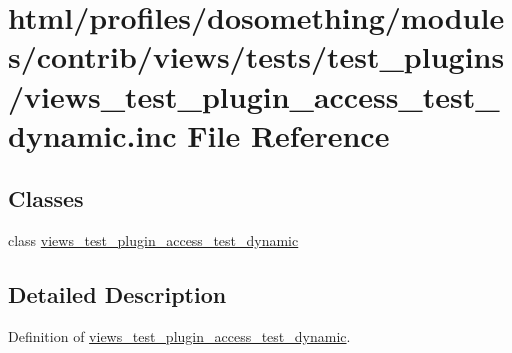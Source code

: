 \hypertarget{views__test__plugin__access__test__dynamic_8inc}{
\section{html/profiles/dosomething/modules/contrib/views/tests/test\_\-plugins/views\_\-test\_\-plugin\_\-access\_\-test\_\-dynamic.inc File Reference}
\label{views__test__plugin__access__test__dynamic_8inc}
}
\subsection*{Classes}
\begin{DoxyCompactItemize}
\item 
class \hyperlink{classviews__test__plugin__access__test__dynamic}{views\_\-test\_\-plugin\_\-access\_\-test\_\-dynamic}
\end{DoxyCompactItemize}


\subsection{Detailed Description}
Definition of \hyperlink{classviews__test__plugin__access__test__dynamic}{views\_\-test\_\-plugin\_\-access\_\-test\_\-dynamic}. 